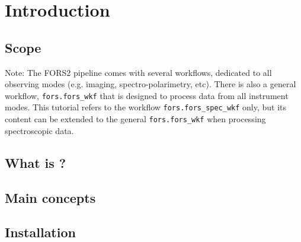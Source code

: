 \section{Introduction}

\subsection{Scope}

Note: The FORS2 pipeline comes with several workflows, dedicated to all observing modes (e.g. imaging, spectro-polarimetry, etc). There is also a general workflow, {\tt fors.fors\_wkf} that is designed to process data from all instrument modes. This tutorial refers to the workflow {\tt fors.fors\_spec\_wkf} only, but its content can be extended to the general {\tt fors.fors\_wkf} when processing spectroscopic data.

\subsection{What is \edps?}
\label{sec:what_is_edps}


\subsection{Main concepts}
\label{sec:main_concepts}


\subsection{Installation}
\label{sec:installation}

